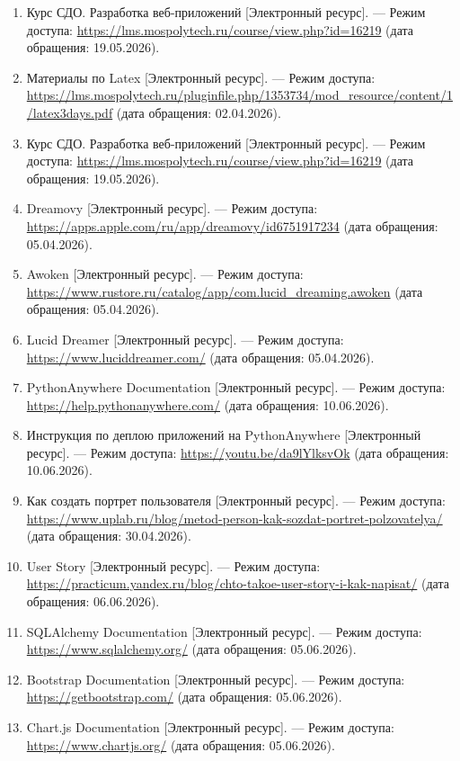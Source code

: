 \documentclass[14pt, a4paper]{extarticle}
\begin{document}
\begin{enumerate}
    \item Курс СДО. Разработка веб-приложений [Электронный ресурс]. — Режим доступа: \url{https://lms.mospolytech.ru/course/view.php?id=16219} (дата обращения: 19.05.2026).
    
    \item Материалы по Latex [Электронный ресурс]. — Режим доступа: \url{https://lms.mospolytech.ru/pluginfile.php/1353734/mod_resource/content/1/latex3days.pdf} (дата обращения: 02.04.2026).

    \item Курс СДО. Разработка веб-приложений [Электронный ресурс]. — Режим доступа: \url{https://lms.mospolytech.ru/course/view.php?id=16219} (дата обращения: 19.05.2026).
    
    \item Dreamovy [Электронный ресурс]. — Режим доступа: \url{https://apps.apple.com/ru/app/dreamovy/id6751917234} (дата обращения: 05.04.2026).
    
    \item Awoken [Электронный ресурс]. — Режим доступа: \url{https://www.rustore.ru/catalog/app/com.lucid_dreaming.awoken} (дата обращения: 05.04.2026).
    
    \item Lucid Dreamer [Электронный ресурс]. — Режим доступа: \url{https://www.luciddreamer.com/} (дата обращения: 05.04.2026).
    
    \item PythonAnywhere Documentation [Электронный ресурс]. — Режим доступа: \url{https://help.pythonanywhere.com/} (дата обращения: 10.06.2026).
    
    \item Инструкция по деплою приложений на PythonAnywhere [Электронный ресурс]. — Режим доступа: \url{https://youtu.be/da9lYlksvOk} (дата обращения: 10.06.2026).
    
    \item Как создать портрет пользователя [Электронный ресурс]. — Режим доступа: \url{https://www.uplab.ru/blog/metod-person-kak-sozdat-portret-polzovatelya/} (дата обращения: 30.04.2026).
    
    \item User Story [Электронный ресурс]. — Режим доступа: \url{https://practicum.yandex.ru/blog/chto-takoe-user-story-i-kak-napisat/} (дата обращения: 06.06.2026).

    \item SQLAlchemy Documentation [Электронный ресурс]. — Режим доступа: \url{https://www.sqlalchemy.org/} (дата обращения: 05.06.2026).
    
    \item Bootstrap Documentation [Электронный ресурс]. — Режим доступа: \url{https://getbootstrap.com/} (дата обращения: 05.06.2026).
    
    \item Chart.js Documentation [Электронный ресурс]. — Режим доступа: \url{https://www.chartjs.org/} (дата обращения: 05.06.2026).
\end{enumerate}
\end{document}
